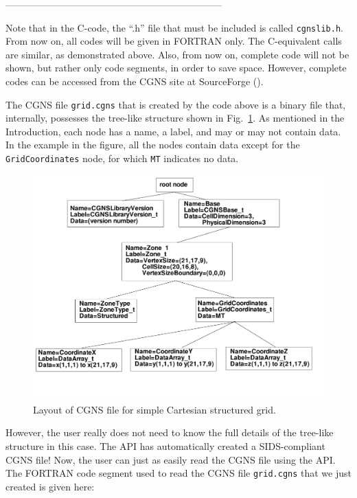 \documentclass[12pt]{article}
\begin{document}
--------------------------------------------------------------------

\noindent Note that in the C-code, the ``.h'' file that must be included
is called {\tt cgnslib.h}.  From now on, all codes will be given in
FORTRAN only.  The C-equivalent calls are similar, as demonstrated
above.  Also, from now on, complete code will not be shown, but
rather only code segments, in order to save space.  However, complete
codes can be accessed from the CGNS site at SourceForge
().

The CGNS file {\tt grid.cgns} that is created by the code above
is a binary
file that, internally, possesses the tree-like structure
shown in Fig.~\ref{FIGtree_cartesian}.  As mentioned in the
Introduction, each node has a name, a label, and may or
may not contain data.  In the example in the figure, all the
nodes contain data except for the {\tt GridCoordinates} node,
for which {\tt MT} indicates no data.

\begin{figure}[hpbt]
\centerline{{\includegraphics[width=150mm]{figures/tree_cartesian}}}
\caption{Layout of CGNS file for simple Cartesian 
structured grid.}
\label{FIGtree_cartesian}
\end{figure}
%

However, the user really does not need to know the full details of
the tree-like structure in this case.  The API has automatically
created a SIDS-compliant CGNS file!  Now, the user can
just as easily read the CGNS file using the API.
The FORTRAN code segment used to read the CGNS file
{\tt grid.cgns} that we just created is given here:
\end{document}

